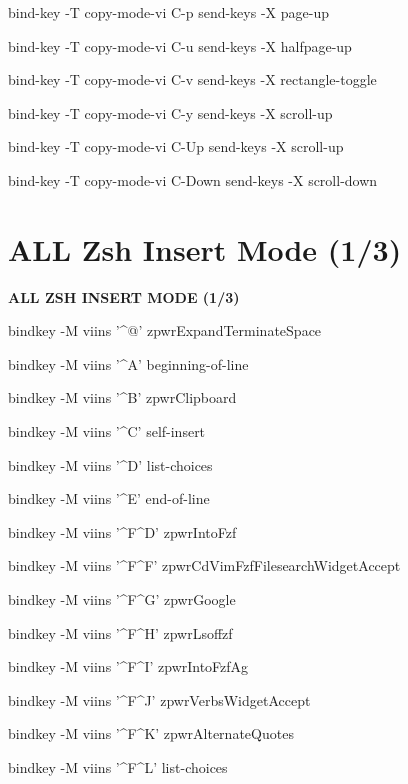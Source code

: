 \documentclass[11pt,a4paper,twoside]{book}
\begin{document}
bind-key  -T copy-mode-vi C-p  send-keys -X page-up

bind-key  -T copy-mode-vi C-u  send-keys -X halfpage-up

bind-key  -T copy-mode-vi C-v  send-keys -X rectangle-toggle

bind-key  -T copy-mode-vi C-y  send-keys -X scroll-up

bind-key  -T copy-mode-vi C-Up  send-keys -X scroll-up

bind-key  -T copy-mode-vi C-Down  send-keys -X scroll-down


\vspace{16pt}

\section{ALL Zsh Insert Mode (1/3)}


\vspace{10pt}
{\large\bfseries\color{neoncyan} ALL ZSH INSERT MODE (1/3)}\vspace{6pt}

bindkey -M viins '\textasciicircum{}@' zpwrExpandTerminateSpace

bindkey -M viins '\textasciicircum{}A' beginning-of-line

bindkey -M viins '\textasciicircum{}B' zpwrClipboard

bindkey -M viins '\textasciicircum{}C' self-insert

bindkey -M viins '\textasciicircum{}D' list-choices

bindkey -M viins '\textasciicircum{}E' end-of-line

bindkey -M viins '\textasciicircum{}F\textasciicircum{}D' zpwrIntoFzf

bindkey -M viins '\textasciicircum{}F\textasciicircum{}F' zpwrCdVimFzfFilesearchWidgetAccept

bindkey -M viins '\textasciicircum{}F\textasciicircum{}G' zpwrGoogle

bindkey -M viins '\textasciicircum{}F\textasciicircum{}H' zpwrLsoffzf

bindkey -M viins '\textasciicircum{}F\textasciicircum{}I' zpwrIntoFzfAg

bindkey -M viins '\textasciicircum{}F\textasciicircum{}J' zpwrVerbsWidgetAccept

bindkey -M viins '\textasciicircum{}F\textasciicircum{}K' zpwrAlternateQuotes

bindkey -M viins '\textasciicircum{}F\textasciicircum{}L' list-choices
\end{document}
